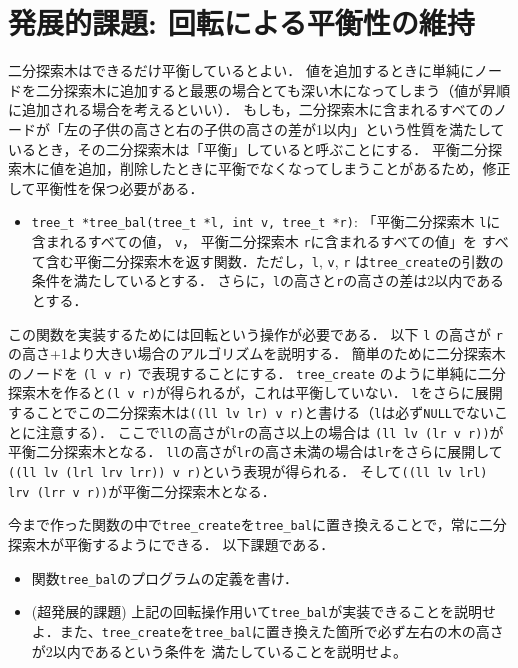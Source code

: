 \documentclass[a4paper,twoside,onecolumn,openany,article]{memoir}
\theoremstyle{remark}
\begin{document}
\section{発展的課題: 回転による平衡性の維持}
二分探索木はできるだけ平衡しているとよい．
値を追加するときに単純にノードを二分探索木に追加すると最悪の場合とても深い木になってしまう（値が昇順に追加される場合を考えるといい）．
もしも，二分探索木に含まれるすべてのノードが「左の子供の高さと右の子供の高さの差が1以内」という性質を満たしているとき，その二分探索木は「平衡」していると呼ぶことにする．
平衡二分探索木に値を追加，削除したときに平衡でなくなってしまうことがあるため，修正して平衡性を保つ必要がある．
\begin{itemize}
\item \texttt{tree\_t *tree\_bal(tree\_t *l, int v, tree\_t *r)}: 「平衡二分探索木 \texttt{l}に含まれるすべての値， \texttt{v}， 平衡二分探索木 \texttt{r}に含まれるすべての値」を
すべて含む平衡二分探索木を返す関数．ただし，\texttt{l}, \texttt{v}, \texttt{r} は\texttt{tree\_create}の引数の条件を満たしているとする．
さらに，\texttt{l}の高さと\texttt{r}の高さの差は2以内であるとする．
\end{itemize}
この関数を実装するためには回転という操作が必要である．
以下 \texttt{l} の高さが \texttt{r} の高さ+1より大きい場合のアルゴリズムを説明する．
簡単のために二分探索木のノードを \texttt{(l v r)} で表現することにする．
\texttt{tree\_create} のように単純に二分探索木を作ると\texttt{(l v r)}が得られるが，これは平衡していない．
\texttt{l}をさらに展開することでこの二分探索木は\texttt{((ll lv lr) v r)}と書ける（\texttt{l}は必ず\texttt{NULL}でないことに注意する）．
ここで\texttt{ll}の高さが\texttt{lr}の高さ以上の場合は
\texttt{(ll lv (lr v r))}が平衡二分探索木となる．
\texttt{ll}の高さが\texttt{lr}の高さ未満の場合は\texttt{lr}をさらに展開して
\texttt{((ll lv (lrl lrv lrr)) v r)}という表現が得られる．
そして\texttt{((ll lv lrl) lrv (lrr v r))}が平衡二分探索木となる．

今まで作った関数の中で\texttt{tree\_create}を\texttt{tree\_bal}に置き換えることで，常に二分探索木が平衡するようにできる．
以下課題である．
\begin{itemize}
\item 関数\texttt{tree\_bal}のプログラムの定義を書け．
\item (超発展的課題) 上記の回転操作用いて\texttt{tree\_bal}が実装できることを説明せよ．また、\texttt{tree\_create}を\texttt{tree\_bal}に置き換えた箇所で必ず左右の木の高さが2以内であるという条件を
満たしていることを説明せよ。
\end{itemize}
\end{document}
